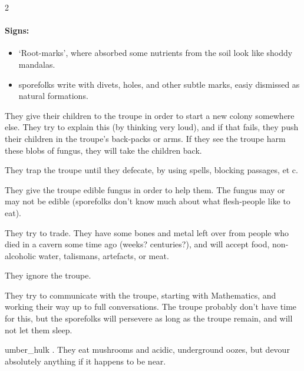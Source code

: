 \begin{multicols}{2}
\wotWosFungus

\showTalisman

\paragraph{Signs:}
\begin{itemize}
  \item
  `Root-marks', where  absorbed some nutrients from the soil look like shoddy mandalas.
  \item
  \Glspl{sporefolk} write with divets, holes, and other subtle marks, easiy dismissed as natural formations.
\end{itemize}


\begin{dlist}
  \item
  They give their children to the troupe in order to start a new colony somewhere else.
  They try to explain this (by thinking very loud), and if that fails, they push their children in the troupe's back-packs or arms.
  If they see the troupe harm these blobs of fungus, they will take the children back.
  \item
  They trap the troupe until they defecate, by using spells, blocking passages, et c.
  \item
  They give the troupe edible fungus in order to help them.
  The fungus may or may not be edible (\glspl{sporefolk} don't know much about what flesh-people like to eat).
  \item
  They try to trade.
  They have some bones and metal left over from people who died in a cavern some time ago (weeks? centuries?), and will accept food, non-alcoholic water, \glspl{talisman}, \glspl{artefact}, or meat.
  \item
  They ignore the troupe.
  \item
  They try to communicate with the troupe, starting with Mathematics, and working their way up to full conversations.
  The troupe probably don't have time for this, but the \glspl{sporefolk} will persevere as long as the troupe remain, and will not let them sleep.
\end{dlist}

\sporeFolk

\sporeFolk

\sporeFolk

  {umber_hulk}%
.
They eat mushrooms and acidic, underground oozes, but devour absolutely anything if it happens to be near.


\end{multicols}
